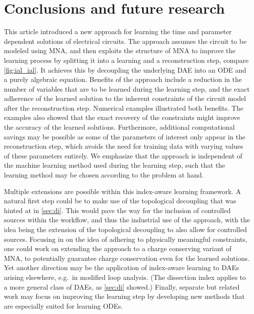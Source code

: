 \documentclass[AMA,STIX1COL]{WileyNJD-v2}
\begin{document}
\section{Conclusions and future research}
\label{sec:cfr}
This article introduced a new approach for learning the time and parameter dependent solutions of electrical circuits. The approach assumes the circuit to be modeled using MNA, and then exploits the structure of MNA to improve the learning process by splitting it into a learning and a reconstruction step, compare \autoref{fig:ial_ial}. It achieves this by decoupling the underlying DAE into an ODE and a purely algebraic equation. Benefits of the approach include a reduction in the number of variables that are to be learned during the learning step, and the exact adherence of the learned solution to the inherent constraints of the circuit model after the reconstruction step. Numerical examples illustrated both benefits. The examples also showed that the exact recovery of the constraints might improve the accuracy of the learned solutions. Furthermore, additional computational savings may be possible as some of the parameters of interest only appear in the reconstruction step, which avoids the need for training data with varying values of these parameters entirely. We emphasize that the approach is independent of the machine learning method used during the learning step, such that the learning method may be chosen according to the problem at hand.

Multiple extensions are possible within this index-aware learning framework. A natural first step could be to make use of the topological decoupling that was hinted at in \autoref{sec:di}. This would pave the way for the inclusion of controlled sources within the workflow, and thus the industrial use of the approach, with the idea being the extension of the topological decoupling to also allow for controlled sources. Focusing in on the idea of adhering to physically meaningful constraints, one could work on extending the approach to a charge conserving variant of MNA, to potentially guarantee charge conservation even for the learned solutions. Yet another direction may be the application of index-aware learning to DAEs arising elsewhere, e.g.~in modified loop analysis. (The dissection index applies to a more general class of DAEs, as \autoref{sec:di} showed.) Finally, separate but related work may focus on improving the learning step by developing new methods that are especially suited for learning ODEs.

\end{document}

